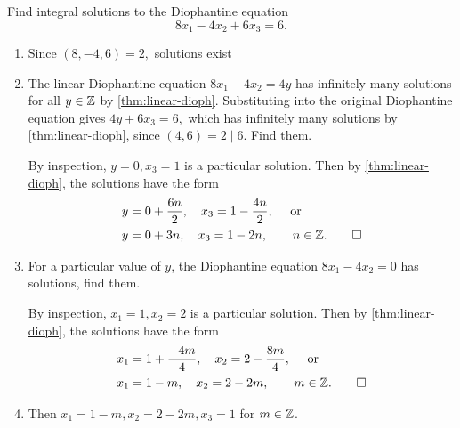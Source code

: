 \documentclass{ximera}
\begin{document}
\begin{br}
Find integral solutions to the Diophantine equation \[8x_1-4x_2+6x_3=6.\]

\begin{enumerate}
    \item Since $(8,-4,6)=2,$ solutions exist
    \item The linear Diophantine equation $8x_1-4x_2=4y$ has infinitely many solutions for all $y\in\mathbb Z$ by \cref{thm:linear-dioph}. Substituting into the original Diophantine equation gives $4y+6x_3=6,$ which has infinitely many solutions by \cref{thm:linear-dioph}, since $(4,6)=2\mid 6$. Find them.
     
    \begin{solution}
        By inspection, $y=0,x_3=1$ is a particular solution. Then by \cref{thm:linear-dioph}, the solutions have the form 
        \begin{align*}
            y&=0+\frac{6n}{2},\quad x_3=1-\frac{4n}{2}, \quad \textnormal{ or }\\
            y&=0+3n,\quad x_3=1-2n, \qquad n\in\mathbb Z. \qedhere
        \end{align*}
        \end{solution}
    \item  For a particular value of $y$, the Diophantine equation $8x_1-4x_2=0$ has solutions, find them. 
    \begin{solution}
        By inspection, $x_1=1,x_2=2$ is a particular solution. Then by \cref{thm:linear-dioph}, the solutions have the form 
        \begin{align*}
            x_1&=1+\frac{-4m}{4},\quad x_2=2-\frac{8m}{4}, \quad \textnormal{ or }\\
            x_1&=1-m,\quad x_2=2-2m, \qquad m\in\mathbb Z. \qedhere
        \end{align*}
        \end{solution}
    \item Then $x_1=1-m, x_2=2-2m,x_3=1$ for $m\in\mathbb Z$.
\end{enumerate}
\end{br}
\end{document}
